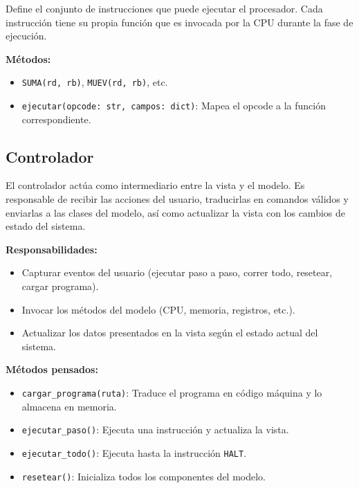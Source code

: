 \documentclass{article}
\begin{document}
Define el conjunto de instrucciones que puede ejecutar el procesador. Cada instrucción tiene
su propia función que es invocada por la CPU durante la fase de ejecución.

\textbf{Métodos:}
\begin{itemize}
  \item \texttt{SUMA(rd, rb)}, \texttt{MUEV(rd, rb)}, etc.
  \item \texttt{ejecutar(opcode: str, campos: dict)}: Mapea el opcode a la función correspondiente.
\end{itemize}


\subsection{Controlador}

El controlador actúa como intermediario entre la vista y el modelo.
Es responsable de recibir las acciones del usuario, traducirlas en comandos válidos y
enviarlas a las clases del modelo, así como actualizar la vista con los cambios
de estado del sistema.

\textbf{Responsabilidades:}
\begin{itemize}
  \item Capturar eventos del usuario (ejecutar paso a paso, correr todo, resetear, cargar programa).
  \item Invocar los métodos del modelo (CPU, memoria, registros, etc.).
  \item Actualizar los datos presentados en la vista según el estado actual del sistema.
\end{itemize}

\textbf{Métodos pensados:}
\begin{itemize}
  \item \texttt{cargar\_programa(ruta)}: Traduce el programa en código máquina y lo
        almacena en memoria.
  \item \texttt{ejecutar\_paso()}: Ejecuta una instrucción y actualiza la vista.
  \item \texttt{ejecutar\_todo()}: Ejecuta hasta la instrucción \texttt{HALT}.
  \item \texttt{resetear()}: Inicializa todos los componentes del modelo.
\end{itemize}

\end{document}

